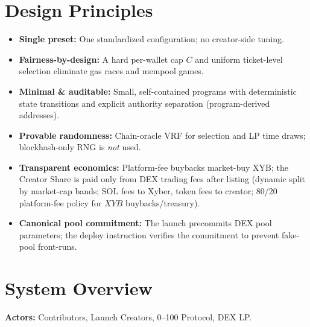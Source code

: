 \documentclass[10pt,twocolumn]{article}
\begin{document}
\section*{Design Principles}
\begin{itemize}
  \item \textbf{Single preset:} One standardized configuration; no creator-side tuning.
  \item \textbf{Fairness-by-design:} A hard per-wallet cap $C$ and uniform ticket-level selection eliminate gas races and mempool games.
  \item \textbf{Minimal \& auditable:} Small, self-contained programs with deterministic state transitions and explicit authority separation (program-derived addresses).
  \item \textbf{Provable randomness:} Chain-oracle VRF for selection and LP time draws; blockhash-only RNG is \emph{not} used.
  \item \textbf{Transparent economics:} Platform-fee buybacks market-buy \textdollar XYB; the Creator Share is paid only from DEX trading fees after listing (dynamic split by market-cap bands; SOL fees to Xyber, token fees to creator; 80/20 platform-fee policy for $XYB$ buybacks/treasury).
  \item \textbf{Canonical pool commitment:} The launch precommits DEX pool parameters; the deploy instruction verifies the commitment to prevent fake-pool front-runs.
\end{itemize}

\section*{System Overview}
\textbf{Actors:} Contributors, Launch Creators, 0--100 Protocol, DEX LP.
\end{document}
